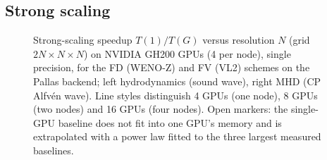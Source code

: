 %

\subsection{Strong scaling}
\label{sec:strong_scaling}

\begin{figure}
    \centering
    
    \caption{Strong-scaling speedup $T(1)/T(G)$ versus resolution $N$
    (grid $2N\times N\times N$) on NVIDIA GH200 GPUs (4 per node), single
    precision, for the FD (WENO-Z) and FV (VL2) schemes on the Pallas
    backend; left hydrodynamics (sound wave), right MHD (CP Alfv\'en
    wave).  Line styles distinguish 4 GPUs (one node), 8 GPUs (two nodes)
    and 16 GPUs (four nodes).  Open markers: the single-GPU baseline does
    not fit into one GPU's memory and is extrapolated with a power law
    fitted to the three largest measured baselines.}
    \label{fig:strong_speedup}
\end{figure}

